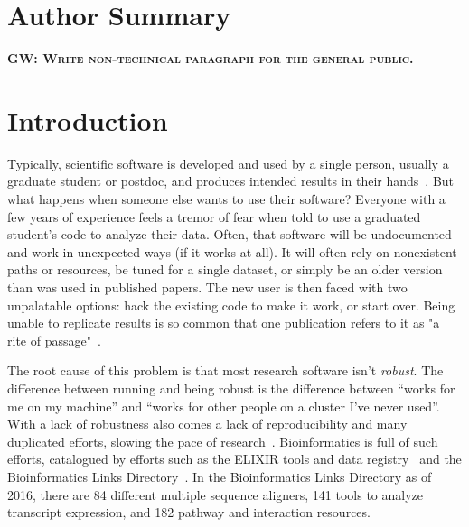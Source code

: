 \documentclass[10pt,letterpaper]{article}
\newcommand{\fixme}[2]{\textsc{\textbf{{#1}: {#2}}}}
\begin{document}
\section*{Author Summary}

\fixme{GW}{Write non-technical paragraph for the general public.}

\linenumbers

\section*{Introduction}

Typically, scientific software is developed and used by a single person,
usually a graduate student or postdoc, and produces intended results in their
hands~\cite{prins2015}. 
But what happens
when someone else wants to use their software? Everyone with
a few years of experience feels a tremor of fear when told to use
a graduated student's code to analyze their data.
Often, that software will be undocumented and work in unexpected
ways (if it works at all).  It will often rely on nonexistent paths or resources,
be tuned for a single dataset,
or simply be an older version than was used in published papers.
The new user is then faced with two unpalatable options:
hack the existing code to make it work, or start over. Being unable to
replicate results is so common that one publication refers to it as "a rite of
passage"~\cite{baker2016}. 

The root cause of this problem is that most research software
isn't \emph{robust}. The difference between running and being
robust is the difference between ``works for me on my machine'' and
``works for other people on a cluster I've never used''. With a lack of
robustness also comes a lack of reproducibility and many duplicated efforts,
slowing the pace of research~\cite{prabhu2011,lawlor2015}.
Bioinformatics is full of such efforts, catalogued by efforts such as
the ELIXIR tools and data registry~\cite{ison2016}
and the Bioinformatics Links Directory~\cite{brazas2012}. In the Bioinformatics
Links Directory as of 2016, there are 84 different multiple sequence aligners, 141 tools
to analyze transcript expression, and 182 pathway and interaction resources.
\end{document}
